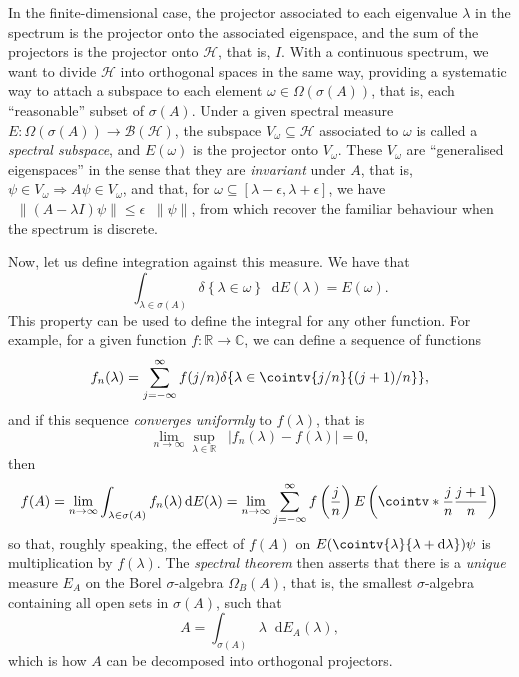 \documentclass[10pt, a4paper]{article}
\numberwithin{equation}{section} %
\theoremstyle{definition}
\theoremstyle{plain}
\newcommand{\norm}[1]{\mathop{}\left\lVert#1\right\rVert}
\newcommand{\abs}[1]{\mathop{}\left\lvert#1\right\rvert}
\newcommand{\dif}{\mathop{}\!\mathrm{d}} %
\newcommand{\?}{\mathrel{?}} %
\newcommand{\R}{\mathbb{R}} %
\newcommand{\C}{\mathbb{C}} %
\newcommand{\indic}[1]{\delta{\left\{#1\right\}}} %
\newcommand{\Hs}{\mathcal{H}} %
\begin{document}
\begin{appendices}
                          In the finite-dimensional case, the projector associated to each eigenvalue \(\lambda\) in the spectrum is the projector onto the associated eigenspace, and the sum of the projectors is the projector onto \(\Hs\), that is, \(I\). With a continuous spectrum, we want to divide \(\Hs\) into orthogonal spaces in the same way, providing a systematic way to attach a subspace to each element \(\omega \in \Omega(\sigma(A))\), that is, each ``reasonable'' subset of \(\sigma(A)\). Under a given spectral measure \(E : \Omega(\sigma(A)) \to \mathcal{B}(\Hs)\), the subspace \(V_{\omega} \subseteq \Hs\) associated to \(\omega\) is called a \emph{spectral subspace}, and \(E(\omega)\) is the projector onto \(V_{\omega}\). These \(V_{\omega}\) are ``generalised eigenspaces'' in the sense that they are \emph{invariant} under \(A\), that is, \(\psi \in V_{\omega} \Rightarrow A\psi \in V_{\omega}\), and that, for \(\omega \subseteq [\lambda - \epsilon, \lambda + \epsilon]\), we have \(\norm{(A - \lambda I)\psi} \leq \epsilon\norm{\psi}\), from which recover the familiar behaviour when the spectrum is discrete.

                          Now, let us define integration against this measure. We have that
                          \begin{equation} \int_{\lambda \in \sigma(A)} \indic{\lambda \in \omega} \dif{E(\lambda)} = E(\omega). \end{equation}
                          This property can be used to define the integral for any other function. For example, for a given function \(f : \R \to \C\), we can define a sequence of functions
                          \[ f_n(\lambda) = \sum_{j = -\infty}^{\infty} f(j/n) \indic{\lambda \in \cointv{j/n}{(j+1)/n}}, \]
                          and if this sequence \emph{converges uniformly} to \(f(\lambda)\), that is
                          \begin{equation} \lim_{n\to\infty} \sup_{\lambda \in \R} \abs{f_n(\lambda) - f(\lambda)} = 0, \end{equation}
                          then
                          \begin{equation} f(A) = \lim_{n\to\infty} \int_{\lambda \in \sigma(A)} f_n(\lambda) \dif{E(\lambda)} = \lim_{n\to\infty} \sum_{j = -\infty}^{\infty} f\left(\frac{j}{n}\right) E\left(\cointv*{\frac{j}{n}}{\frac{j+1}{n}}\right) \end{equation}
                          so that, roughly speaking, the effect of \(f(A)\) on \(E(\cointv{\lambda}{\lambda+\dif{\lambda}})\psi\) is multiplication by \(f(\lambda)\). The \emph{spectral theorem} then asserts that there is a \emph{unique} measure \(E_A\) on the Borel \(\sigma\)-algebra \(\Omega_B(A)\), that is, the smallest \(\sigma\)-algebra containing all open sets in \(\sigma(A)\), such that
                          \[ A = \int_{\sigma(A)} \lambda \dif{E_A(\lambda)}, \]
                          which is how \(A\) can be decomposed into orthogonal projectors.


\end{appendices}
\end{document}
